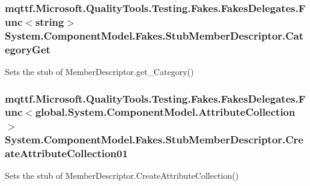 \hypertarget{class_system_1_1_component_model_1_1_fakes_1_1_stub_member_descriptor_a92fe0d04f0d41d8044e8417b5fcc3353}{
\subsubsection[{Category\-Get}]{\setlength{\rightskip}{0pt plus 5cm}mqttf.\-Microsoft.\-Quality\-Tools.\-Testing.\-Fakes.\-Fakes\-Delegates.\-Func$<$string$>$ System.\-Component\-Model.\-Fakes.\-Stub\-Member\-Descriptor.\-Category\-Get}}\label{class_system_1_1_component_model_1_1_fakes_1_1_stub_member_descriptor_a92fe0d04f0d41d8044e8417b5fcc3353}


Sets the stub of Member\-Descriptor.\-get\-\_\-\-Category()

\hypertarget{class_system_1_1_component_model_1_1_fakes_1_1_stub_member_descriptor_aee7f6c7af0b523d95c00d077dad8c11e}{
\subsubsection[{Create\-Attribute\-Collection01}]{\setlength{\rightskip}{0pt plus 5cm}mqttf.\-Microsoft.\-Quality\-Tools.\-Testing.\-Fakes.\-Fakes\-Delegates.\-Func$<$global.\-System.\-Component\-Model.\-Attribute\-Collection$>$ System.\-Component\-Model.\-Fakes.\-Stub\-Member\-Descriptor.\-Create\-Attribute\-Collection01}}\label{class_system_1_1_component_model_1_1_fakes_1_1_stub_member_descriptor_aee7f6c7af0b523d95c00d077dad8c11e}


Sets the stub of Member\-Descriptor.\-Create\-Attribute\-Collection()

